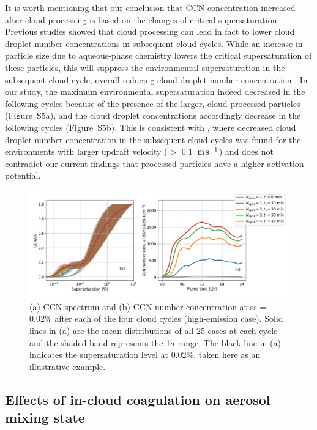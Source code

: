 \documentclass[edeposit,fullpage]{uiucthesis2009}
\begin{document}
It is worth mentioning that our conclusion that CCN
  concentration increased after cloud processing is based on the
  changes of critical supersaturation. Previous studies showed that
  cloud processing can lead in fact to lower cloud droplet number
  concentrations in subsequent cloud cycles. While an increase in
  particle size due to aqueous-phase chemistry lowers the critical
  supersaturation of these particles, this will suppress the
  environmental supersaturation in the subsequent cloud cycle, overall
  reducing cloud droplet number concentration
  \cite{choularton1997effect, feingold2000does,
    romakkaniemi2006influence,
    ivanova2008aerosol,bower1999modelling}. In our study, the maximum
  environmental supersaturation indeed decreased in the following
  cycles because of the presence of the larger, cloud-processed
  particles (Figure~S5a), and the cloud droplet concentrations
  accordingly decrease in the following cycles (Figure~S5b). This is
  consistent with \citet{feingold2000does}, where decreased cloud
  droplet number concentration in the subsequent cloud cycles was
  found for the environments with larger updraft velocity ($>$ 0.1~$\rm m
  \, s^{-1}$) and does not contradict our current findings that
  processed particles have a higher activation potential.


\begin{figure}
    \centering
    \includegraphics[scale=0.4]{chap3_figs/fig11.pdf}
    \caption{(a) CCN spectrum and (b) CCN number
      concentration at ss = 0.02\% after each of the four cloud
      cycles (high-emission case). Solid lines in (a) are the
      mean distributions of all 25 cases at each cycle and the shaded
      band represents the 1$\sigma$ range. The black line in (a)
      indicates the supersaturation level at 0.02\%, taken here
        as an illustrative example.}
    \label{fig:cycle_ccn}
\end{figure}

\subsection{Effects of in-cloud coagulation on aerosol mixing state} \label{sec:coag}
\end{document}
